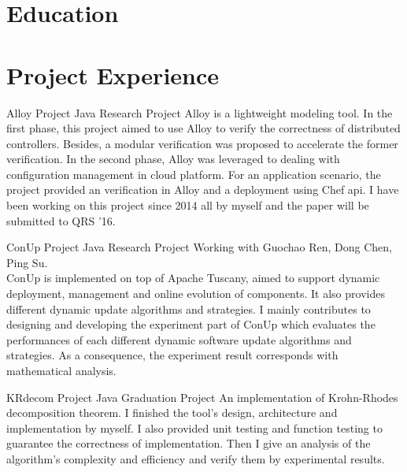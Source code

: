 \documentclass[11pt,a4paper]{moderncv}
\title{}
\begin{document}
\maketitle

\section{Education}

\section{Project Experience}

{Alloy Project}
{Java}
{Research Project}{}
{
Alloy is a lightweight modeling tool. In the first phase, this project aimed to use Alloy to verify the correctness of distributed controllers. Besides, a modular verification was proposed to accelerate the former verification. In the second phase, Alloy was leveraged to dealing with configuration management in cloud platform. For an application scenario, the project provided an verification in Alloy and a deployment using Chef api. I have been working on this project since 2014 all
by myself and the paper will be submitted to QRS '16.
}

\vspace*{0.2\baselineskip}

{ConUp Project}
{Java}
{Research Project}{}
{
Working with Guochao Ren, Dong Chen, Ping Su.\\
ConUp is implemented on top of Apache Tuscany, aimed to support dynamic deployment, management and online evolution of components. It also provides different dynamic update algorithms and strategies. I mainly contributes to designing and developing the experiment part of ConUp which evaluates the performances of each different dynamic software update algorithms and strategies. As a consequence, the experiment result corresponds with mathematical analysis.
}

\vspace*{0.2\baselineskip}

{KRdecom Project}
{Java}
{Graduation Project}{}
{
An implementation of Krohn-Rhodes decomposition theorem. I finished the tool's design, architecture and implementation by myself. I also provided unit testing and function testing to guarantee the correctness of implementation. Then I give an analysis of the algorithm's complexity and efficiency and verify them by experimental results.
}
\end{document}
